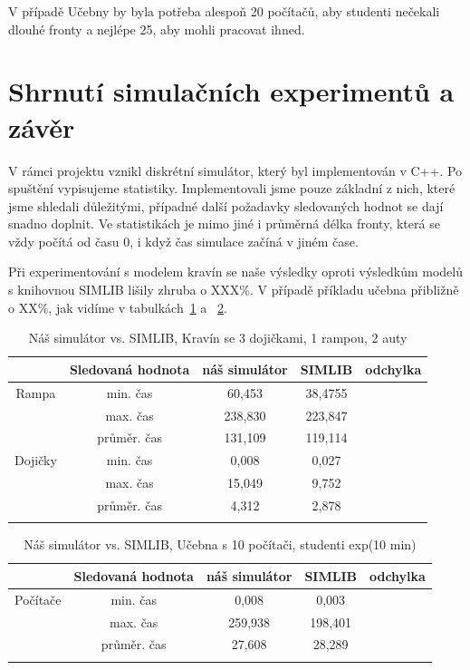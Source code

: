 \documentclass[12pt,a4paper,titlepage,final]{article}
\begin{document}
V případě Učebny by byla potřeba alespoň 20 počítačů, aby studenti nečekali dlouhé fronty a nejlépe 25, aby mohli pracovat ihned.


\section{Shrnutí simulačních experimentů a závěr}

V rámci projektu vznikl diskrétní simulátor, který byl implementován v C++. Po spuštění vypisujeme statistiky. Implementovali jsme pouze základní z nich, které jsme shledali důležitými, případné další požadavky sledovaných hodnot se dají snadno doplnit.
Ve statistikách je mimo jiné i průměrná délka fronty, která se vždy počítá od času 0, i když čas simulace začíná v jiném čase.

Při experimentování s modelem kravín se naše výsledky oproti výsledkům modelů s knihovnou SIMLIB lišily zhruba o XXX\%. V případě příkladu učebna přibližně o XX\%, jak vidíme v tabulkách~\ref{srovnani} a ~\ref{srovnani2}.


\begin{table}[ht]
\caption{Náš simulátor vs. SIMLIB, Kravín se 3 dojičkami, 1 rampou, 2 auty}
\centering
\begin{tabular}{c c c c c}
\hline\hline
& Sledovaná hodnota & náš simulátor & SIMLIB & odchylka\\[0.5ex]
\hline
Rampa & min. čas&  60,453 & 38,4755&\\
 & max. čas & 238,830 & 223,847&\\
 & průměr. čas & 131,109 & 119,114&\\
Dojičky & min. čas & 0,008 & 0,027&\\
 & max. čas & 15,049 & 9,752&\\
 & průměr. čas & 4,312 & 2,878&\\[1ex]
\hline
\label{srovnani}
\end{tabular}
\end{table}

\begin{table}[ht]
\caption{Náš simulátor vs. SIMLIB, Učebna s 10 počítači, studenti exp(10 min)}
\centering
\begin{tabular}{c c c c c}
\hline\hline
& Sledovaná hodnota & náš simulátor & SIMLIB & odchylka\\[0.5ex]
\hline
Počítače & min. čas&  0,008 & 0,003&\\
 & max. čas & 259,938 & 198,401&\\
 & průměr. čas & 27,608 & 28,289&\\[1ex]
\hline
\label{srovnani2}
\end{tabular}
\end{table}

\newpage



\end{document}
